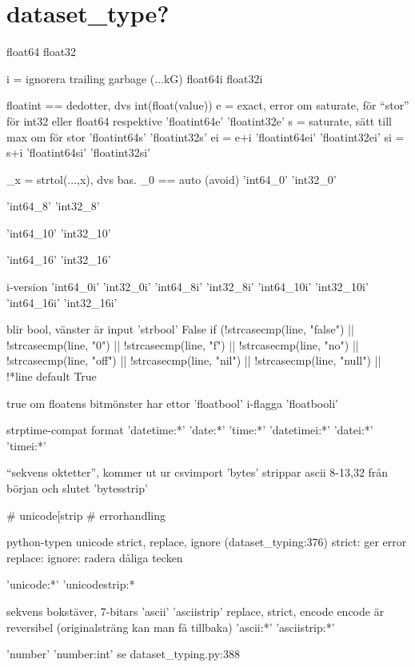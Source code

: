\section{dataset_type?}

float64
float32

i = ignorera trailing garbage (...kG)
  float64i
  float32i

floatint == dedotter, dvs    int(float(value))
e = exact, error om saturate, för ``stor'' för int32 eller float64 respektive
    'floatint64e'  
    'floatint32e'  
s = saturate, sätt till max om för stor
    'floatint64s'  
    'floatint32s'  
ei = e+i
    'floatint64ei' 
    'floatint32ei' 
si = s+i
    'floatint64si' 
    'floatint32si' 

_x = strtol(...,x), dvs bas.
_0 == auto (avoid)
    'int64_0'      
    'int32_0'      

    'int64_8'      
    'int32_8'      

    'int64_10'     
    'int32_10'     

    'int64_16'     
    'int32_16'     

i-version
    'int64_0i'     
    'int32_0i'     
    'int64_8i'     
    'int32_8i'     
    'int64_10i'    
    'int32_10i'    
    'int64_16i'    
    'int32_16i'    

blir bool, vänster är input
    'strbool'      
False 		if (!strcasecmp(line, "false")
		    || !strcasecmp(line, "0")
		    || !strcasecmp(line, "f")
		    || !strcasecmp(line, "no")
		    || !strcasecmp(line, "off")
		    || !strcasecmp(line, "nil")
		    || !strcasecmp(line, "null")
		    || !*line
default True

true om floatens bitmönster har ettor
    'floatbool'    
i-flagga
    'floatbooli'   

strptime-compat format
    'datetime:*'   
    'date:*'       
    'time:*'       
    'datetimei:*'  
    'datei:*'      
    'timei:*'      

``sekvens oktetter'', kommer ut ur csvimport
    'bytes'        
strippar ascii 8-13,32 från början och slutet
    'bytesstrip'   


    # unicode[strip
    # errorhandling

python-typen unicode
strict, replace, ignore (dataset_typing:376)
strict:   ger error
replace:  
ignore:   radera dåliga tecken

    'unicode:*'    
    'unicodestrip:*

sekvens bokstäver, 7-bitars
    'ascii'        
    'asciistrip'   
replace, strict, encode
encode är reversibel (originalsträng kan man få tillbaka)
    'ascii:*'      
    'asciistrip:*' 


    'number'       
    'number:int'  se dataset_typing.py:388


